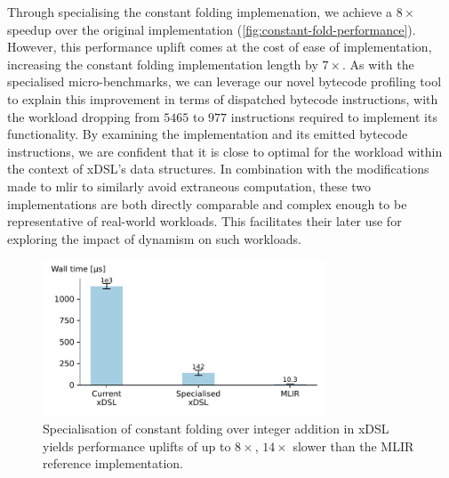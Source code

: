 Through specialising the constant folding implemenation, we achieve a $8\times$ speedup over the original implementation (\autoref{fig:constant-fold-performance}).
However, this performance uplift comes at the cost of ease of implementation, increasing the constant folding implementation length by $7\times$.
As with the specialised micro-benchmarks, we can leverage our novel bytecode profiling tool to explain this improvement in terms of dispatched bytecode instructions, with the workload dropping from $5465$ to $977$ instructions required to implement its functionality.
By examining the implementation and its emitted bytecode instructions, we are confident that it is close to optimal for the workload within the context of xDSL's data structures.
In combination with the modifications made to \ac{mlir} to similarly avoid extraneous computation, these two implementations are both directly comparable and complex enough to be representative of real-world workloads.
This facilitates their later use for exploring the impact of dynamism on such workloads.


\begin{figure}[H]
    \centering
    \includegraphics[width=0.75\textwidth]{images/specialising_optimising_xdsl_rewriting/constant_performance.pdf}
    \caption{Specialisation of constant folding over integer addition in xDSL yields performance uplifts of
up to $8\times$, $14\times$ slower than the MLIR reference
implementation.}
    \label{fig:constant-fold-performance}
\end{figure}

